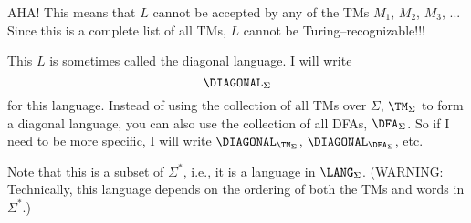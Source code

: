 AHA!
This means that $L$ cannot be accepted by any of the TMs
$M_1$, $M_2$, $M_3$, ...
Since this is a complete list of all TMs,
$L$ cannot be Turing--recognizable!!!

This $L$ is sometimes called the diagonal language.
I will write
\[
\DIAGONAL_\Sigma
\]
for this language.
Instead of using the collection of all TMs over $\Sigma$, $\TM_{\Sigma}$
to form a
diagonal language, you can also use the collection of all
DFAs, $\DFA_{\Sigma}$. So if I need to be more specific, I will write
$\DIAGONAL_{\TM_{\Sigma}}$,
$\DIAGONAL_{\DFA_{\Sigma}}$, etc.

Note that this is a subset of $\Sigma^*$, i.e., 
it is a language in $\LANG_\Sigma$.
(WARNING: Technically, this 
language depends on the ordering of both the TMs and 
words in $\Sigma^*$.)


\begin{comment}
(Note:
The above simply gives a pairing between $\TM$ and $\Sigma^*$:
\begin{align*}
\TM \times \Sigma^* &\rightarrow \{0,1\} \\
\langle M, w \rangle &=
\begin{cases}
1 & \text{ if $M$ accepts $w$} \\ 
0 & \text{ otherwise} \\ 
\end{cases}
\end{align*}
Composing with $\N$ (using any encoding of TMs and $\Sigma^*$, we get
\begin{align*}
\N \rightarrow \TM \times \Sigma^* &\rightarrow \{0,1\} \\
i \mapsto \langle M_i, w_i \rangle &=
\begin{cases}
1 & \text{ if $M$ accepts $w$} \\ 
0 & \text{ otherwise} \\ 
\end{cases}
\end{align*}
\end{comment}
